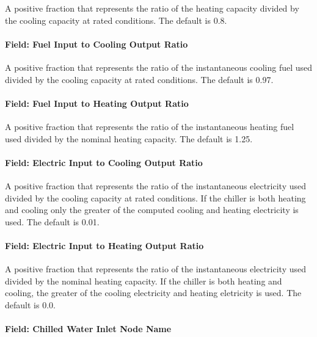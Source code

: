 A positive fraction that represents the ratio of the heating capacity divided by the cooling capacity at rated conditions. The default is 0.8.

\paragraph{Field: Fuel Input to Cooling Output Ratio}\label{field-fuel-input-to-cooling-output-ratio}

A positive fraction that represents the ratio of the instantaneous cooling fuel used divided by the cooling capacity at rated conditions. The default is 0.97.

\paragraph{Field: Fuel Input to Heating Output Ratio}\label{field-fuel-input-to-heating-output-ratio}

A positive fraction that represents the ratio of the instantaneous heating fuel used divided by the nominal heating capacity. The default is 1.25.

\paragraph{Field: Electric Input to Cooling Output Ratio}\label{field-electric-input-to-cooling-output-ratio}

A positive fraction that represents the ratio of the instantaneous electricity used divided by the cooling capacity at rated conditions. If the chiller is both heating and cooling only the greater of the computed cooling and heating electricity is used. The default is 0.01.

\paragraph{Field: Electric Input to Heating Output Ratio}\label{field-electric-input-to-heating-output-ratio}

A positive fraction that represents the ratio of the instantaneous electricity used divided by the nominal heating capacity. If the chiller is both heating and cooling, the greater of the cooling electricity and heating eletricity is used. The default is 0.0.

\paragraph{Field: Chilled Water Inlet Node Name}\label{field-chilled-water-inlet-node-name-7}

